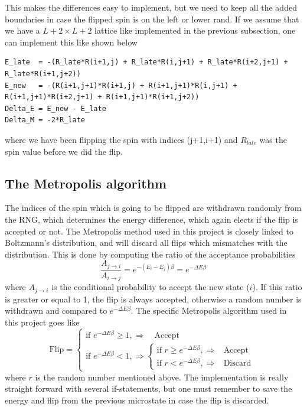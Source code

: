 \documentclass[norsk,a4paper,12pt]{article}
\begin{document}
This makes the differences easy to implement, but we need to keep all the added boundaries in case the flipped spin is on the left or lower rand. If we assume that we have a $L+2\times L+2$ lattice like implemented in the previous subsection, one can implement this like shown below
\begin{lstlisting}
E_late  = -(R_late*R(i+1,j) + R_late*R(i,j+1) + R_late*R(i+2,j+1) + R_late*R(i+1,j+2))
E_new   = -(R(i+1,j+1)*R(i+1,j) + R(i+1,j+1)*R(i,j+1) + R(i+1,j+1)*R(i+2,j+1) + R(i+1,j+1)*R(i+1,j+2))
Delta_E = E_new - E_late
Delta_M = -2*R_late
\end{lstlisting}
where we have been flipping the spin with indices (j+1,i+1) and $R_{late}$ was the spin value before we did the flip.

\subsection{The Metropolis algorithm}
The indices of the spin which is going to be flipped are withdrawn randomly from the RNG, which determines the energy difference, which again elects if the flip is accepted or not. The Metropolis method used in this project is closely linked to Boltzmann's distribution, and will discard all flips which mismatches with the distribution. This is done by computing the ratio of the acceptance probabilities 
\begin{equation}
\frac{A_{j\rightarrow i}}{A_{i\rightarrow j}}=e^{-(E_i-E_j)\beta}=e^{-\Delta E\beta}
\end{equation}
where $A_{j\rightarrow i}$ is the conditional probability to accept the new state ($i$). If this ratio is greater or equal to 1, the flip is always accepted, otherwise a random number is withdrawn and compared to $e^{-\Delta E\beta}$. The specific Metropolis algorithm used in this project goes like
\begin{equation}
\text{Flip} =
    \begin{cases}
            \text{if } e^{-\Delta E\beta}\geq1,\Rightarrow \quad \text{Accept}\\
            \text{if } e^{-\Delta E\beta}<1,\Rightarrow
            \begin{cases}
            		\text{if } r\geq e^{-\Delta E\beta},\Rightarrow & \text{Accept}\\
            		\text{if } r<e^{-\Delta E\beta},\Rightarrow & \text{Discard}
            \end{cases}
    \end{cases}
\end{equation}
where $r$ is the random number mentioned above. The implementation is really straight forward with several if-statements, but one must remember to save the energy and flip from the previous microstate in case the flip is discarded. 
\end{document}
